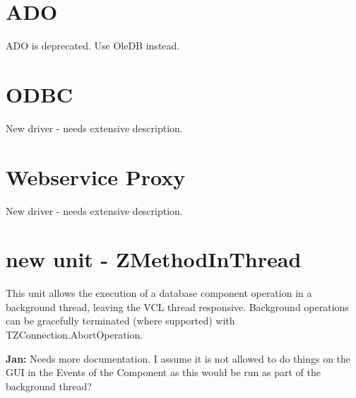 \documentclass[a4paper,12pt,oneside]{article}
\begin{document}
\section{ADO}
ADO is deprecated. Use OleDB instead.

\section{ODBC}
New driver - needs extensive description.

\section{Webservice Proxy}
New driver - needs extensive description.

\section{new unit - ZMethodInThread}
This unit allows the execution of a database component operation in a background thread, leaving the VCL thread responsive.
Background operations can be gracefully terminated (where supported) with TZConnection.AbortOperation.

\textbf{Jan:}
Needs more documentation.
I assume it is not allowed to do things on the GUI in the Events of the Component as this would be run as part of the background thread?
\end{document}
